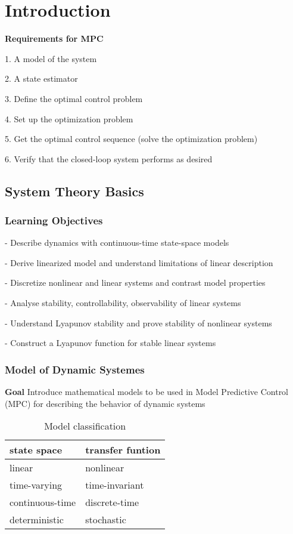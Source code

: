 \chapter{Introduction}

\textbf{Requirements for MPC}

1. A model of the system

2. A state estimator

3. Define the optimal control problem

4. Set up the optimization problem

5. Get the optimal control sequence (solve the optimization problem)

6. Verify that the closed-loop system performs as desired

\section{System Theory Basics}

\subsection{Learning Objectives}

- Describe dynamics with continuous-time state-space models

- Derive linearized model and understand limitations of linear description

- Discretize nonlinear and linear systems and contrast model properties

- Analyse stability, controllability, observability of linear systems

- Understand Lyapunov stability and prove stability of nonlinear systems

- Construct a Lyapunov function for stable linear systems

\subsection{Model of Dynamic Systemes}

\textbf{Goal} Introduce mathematical models to be used in Model Predictive Control
(MPC) for describing the behavior of dynamic systems

\begin{table}[h]
	\begin{center}
		\caption{Model classification}\label{tab:}
		\begin{tabular}[c]{|l|l|}
			\hline
			state  space    & transfer funtion \\ \hline
			linear          & nonlinear        \\ \hline
			time-varying    & time-invariant   \\ \hline
			continuous-time & discrete-time    \\ \hline
			deterministic   & stochastic       \\ \hline
		\end{tabular}
	\end{center}
\end{table}

